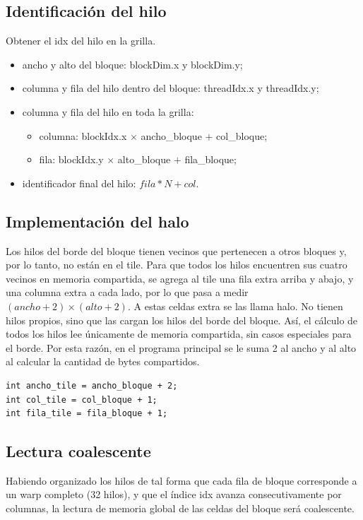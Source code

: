 \subsection{Identificación del hilo}
Obtener el idx del hilo en la grilla.
    \begin{itemize}
        \item ancho y alto del bloque: blockDim.x y blockDim.y;
        \item columna y fila del hilo dentro del bloque: threadIdx.x y threadIdx.y;
        \item columna y fila del hilo en toda la grilla:
        \begin{itemize}
            \item columna: blockIdx.x $\times$ ancho\_bloque $+$ col\_bloque;
            \item fila: blockIdx.y $\times$ alto\_bloque $+$ fila\_bloque;
        \end{itemize}
        \item identificador final del hilo: $fila * N + col$.
    \end{itemize}

\subsection{Implementación del halo}
Los hilos del borde del bloque tienen vecinos que pertenecen a otros bloques y, por lo tanto, no están en el tile. Para que todos los hilos encuentren sus cuatro vecinos en memoria compartida, se agrega al tile una fila extra arriba y abajo, y una columna extra a cada lado, por lo que pasa a medir $(ancho + 2) \times (alto + 2)$. A estas celdas extra se las llama halo. No tienen hilos propios, sino que las cargan los hilos del borde del bloque. Así, el cálculo de todos los hilos lee únicamente de memoria compartida, sin casos especiales para el borde. Por esta razón, en el programa principal se le suma 2 al ancho y al alto al calcular la cantidad de bytes compartidos.

\begin{lstlisting}[firstnumber=117]
int ancho_tile = ancho_bloque + 2;
int col_tile = col_bloque + 1;
int fila_tile = fila_bloque + 1;
\end{lstlisting}

\subsection{Lectura coalescente}
Habiendo organizado los hilos de tal forma que cada fila de bloque corresponde a un warp completo (32 hilos), y que el índice idx avanza consecutivamente por columnas, la lectura de memoria global de las celdas del bloque será coalescente.

